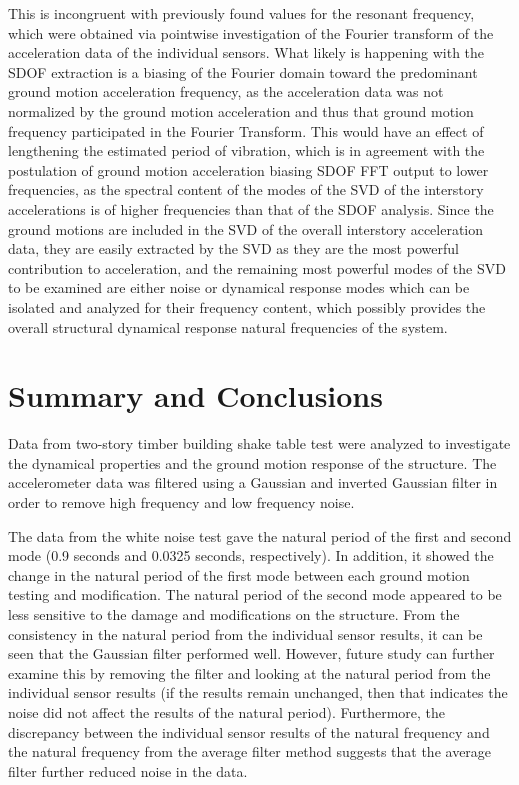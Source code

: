 \documentclass{article}
\begin{document}
\par This is incongruent with previously found values for the resonant frequency, which were obtained via pointwise investigation of the Fourier transform of the acceleration data of the individual sensors. What likely is happening with the SDOF extraction is a biasing of the Fourier domain toward the predominant ground motion acceleration frequency, as the acceleration data was not normalized by the ground motion acceleration and thus that ground motion frequency participated in the Fourier Transform. This would have an effect of lengthening the estimated period of vibration, which is in agreement with the postulation of ground motion acceleration biasing SDOF FFT output to lower frequencies, as the spectral content of the modes of the SVD of the interstory accelerations is of higher frequencies than that of the SDOF analysis. Since the ground motions are included in the SVD of the overall interstory acceleration data, they are easily extracted by the SVD as they are the most powerful contribution to acceleration, and the remaining most powerful modes of the SVD to be examined are either noise or dynamical response modes which can be isolated and analyzed for their frequency content, which possibly provides the overall structural dynamical response natural frequencies of the system.


\FloatBarrier
\section{Summary and Conclusions}

Data from two-story timber building shake table test were analyzed to investigate the dynamical properties and the ground motion response of the structure. The accelerometer data was filtered using a Gaussian and inverted Gaussian filter in order to remove high frequency and low frequency noise.

\medskip

The data from the white noise test gave the natural period of the first and second mode (0.9 seconds and 0.0325 seconds, respectively). In addition, it showed the change in the natural period of the first mode between each ground motion testing and modification. The natural period of the second mode appeared to be less sensitive to the damage and modifications on the structure. From the consistency in the natural period from the individual sensor results, it can be seen that the Gaussian filter performed well. However, future study can further examine this by removing the filter and looking at the natural period from the individual sensor results (if the results remain unchanged, then that indicates the noise did not affect the results of the natural period). Furthermore, the discrepancy between the individual sensor results of the natural frequency and the natural frequency from the average filter method suggests that the average filter further reduced noise in the data.
\end{document}
